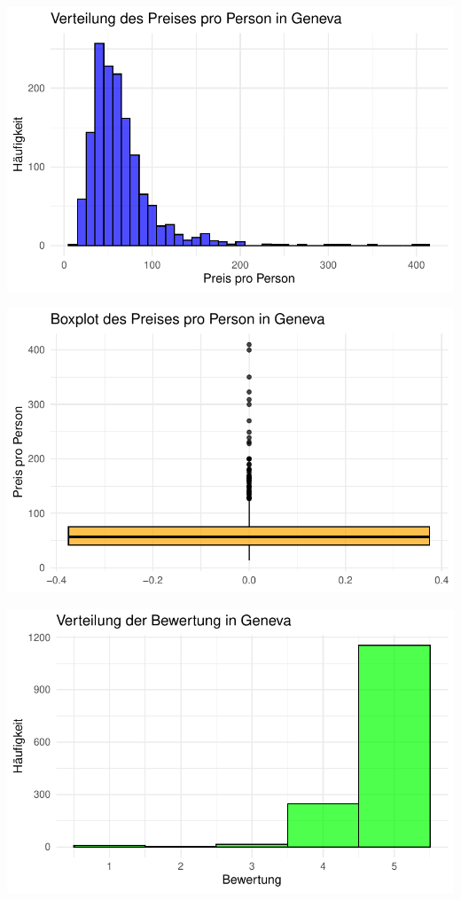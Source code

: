 \documentclass[
  journal,
]{IEEEtran}%
\begin{document}
\includegraphics{main_files/figure-pdf/descriptive geneva-1.pdf}

\includegraphics{main_files/figure-pdf/descriptive geneva-2.pdf}

\includegraphics{main_files/figure-pdf/descriptive geneva-3.pdf}
\end{document}
